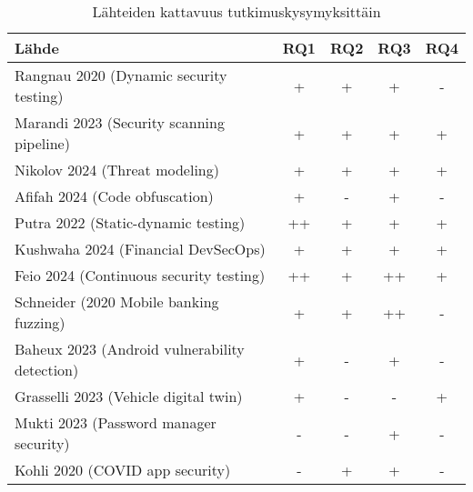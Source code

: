 \documentclass[bscthesis,finnish,oneside,biblatex]{uefcsthesis}
\begin{document}

    \begin{table}[htbp]
        \centering
        \footnotesize
        \caption{Lähteiden kattavuus tutkimuskysymyksittäin}
        \label{tab:rq_matrix}
        \begin{tabular}{p{7cm}cccc}
            \toprule
            \textbf{Lähde}                                  & \textbf{RQ1} & \textbf{RQ2} & \textbf{RQ3} & \textbf{RQ4} \\
            \midrule
            Rangnau 2020 (Dynamic security testing)         & +            & +            & +            & -            \\
            Marandi 2023 (Security scanning pipeline)       & +            & +            & +            & +            \\
            Nikolov 2024 (Threat modeling)                  & +            & +            & +            & +            \\
            Afifah 2024 (Code obfuscation)                  & +            & -            & +            & -            \\
            Putra 2022 (Static-dynamic testing)             & ++           & +            & +            & +            \\
            Kushwaha 2024 (Financial DevSecOps)             & +            & +            & +            & +            \\
            Feio 2024 (Continuous security testing)         & ++           & +            & ++           & +            \\
            Schneider (2020 Mobile banking fuzzing)         & +            & +            & ++           & -            \\
            Baheux 2023 (Android vulnerability detection)   & +            & -            & +            & -            \\
            Grasselli 2023 (Vehicle digital twin)           & +            & -            & -            & +            \\
            Mukti 2023 (Password manager security)          & -            & -            & +            & -            \\
            Kohli 2020 (COVID app security)                 & -            & +            & +            & -            \\

\end{tabular}
\end{table}
\end{document}
